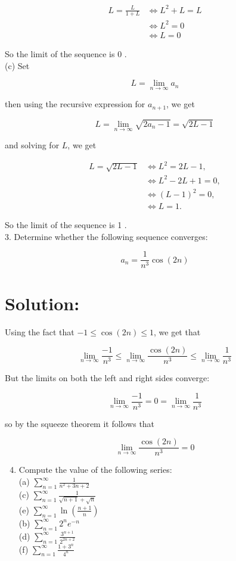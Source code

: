 \documentclass[10pt]{article}
\begin{document}
$$
\begin{aligned}
L=\frac{L}{1+L} & \Longleftrightarrow L^{2}+L=L \\
& \Longleftrightarrow L^{2}=0 \\
& \Longleftrightarrow L=0
\end{aligned}
$$

So the limit of the sequence is 0 .\\
(c) Set

$$
L=\lim _{n \rightarrow \infty} a_{n}
$$

then using the recursive expression for $a_{n+1}$, we get

$$
L=\lim _{n \rightarrow \infty} \sqrt{2 a_{n}-1}=\sqrt{2 L-1}
$$

and solving for $L$, we get

$$
\begin{aligned}
L=\sqrt{2 L-1} & \Longleftrightarrow L^{2}=2 L-1, \\
& \Longleftrightarrow L^{2}-2 L+1=0, \\
& \Longleftrightarrow(L-1)^{2}=0, \\
& \Longleftrightarrow L=1 .
\end{aligned}
$$

So the limit of the sequence is 1 .\\
3. Determine whether the following sequence converges:

$$
a_{n}=\frac{1}{n^{3}} \cos (2 n)
$$

\section*{Solution:}
Using the fact that $-1 \leq \cos (2 n) \leq 1$, we get that

$$
\lim _{n \rightarrow \infty} \frac{-1}{n^{3}} \leq \lim _{n \rightarrow \infty} \frac{\cos (2 n)}{n^{3}} \leq \lim _{n \rightarrow \infty} \frac{1}{n^{3}}
$$

But the limits on both the left and right sides converge:

$$
\lim _{n \rightarrow \infty} \frac{-1}{n^{3}}=0=\lim _{n \rightarrow \infty} \frac{1}{n^{3}}
$$

so by the squeeze theorem it follows that

$$
\lim _{n \rightarrow \infty} \frac{\cos (2 n)}{n^{3}}=0
$$

\begin{enumerate}
  \setcounter{enumi}{3}
  \item Compute the value of the following series:\\
(a) $\sum_{n=1}^{\infty} \frac{1}{n^{2}+3 n+2}$\\
(c) $\sum_{n=1}^{\infty} \frac{1}{\sqrt{n+1}+\sqrt{n}}$\\
(e) $\sum_{n=1}^{\infty} \ln \left(\frac{n+1}{n}\right)$\\
(b) $\sum_{n=1}^{\infty} 2^{n} e^{-n}$\\
(d) $\sum_{n=1}^{\infty} \frac{3^{n+1}}{2^{2 n+2}}$\\
(f) $\sum_{n=1}^{\infty} \frac{1+3^{n}}{4^{n}}$
\end{enumerate}
\end{document}
